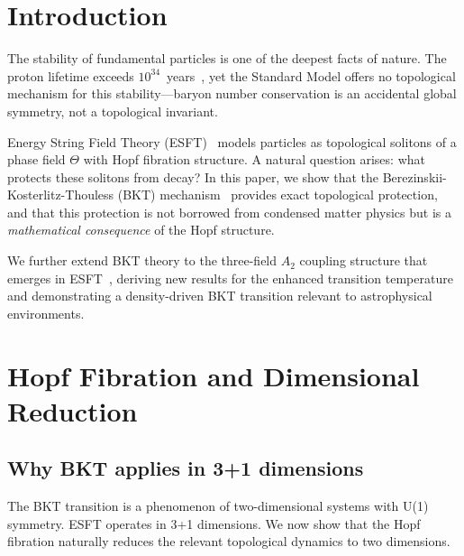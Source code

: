 ﻿\documentclass[twocolumn,showpacs,preprintnumbers,amsmath,amssymb,prd]{revtex4-2}
\begin{document}

\maketitle

\section{Introduction}

The stability of fundamental particles is one of the deepest facts of nature. The proton lifetime exceeds $10^{34}$~years~\cite{PDG2024}, yet the Standard Model offers no topological mechanism for this stability---baryon number conservation is an accidental global symmetry, not a topological invariant.

Energy String Field Theory (ESFT)~\cite{Paper1,Paper2,Paper3} models particles as topological solitons of a phase field $\Theta$ with Hopf fibration structure. A natural question arises: what protects these solitons from decay? In this paper, we show that the Berezinskii-Kosterlitz-Thouless (BKT) mechanism~\cite{Kosterlitz1973,Berezinskii1971} provides exact topological protection, and that this protection is not borrowed from condensed matter physics but is a \emph{mathematical consequence} of the Hopf structure.

We further extend BKT theory to the three-field $A_2$ coupling structure that emerges in ESFT~\cite{Paper2}, deriving new results for the enhanced transition temperature and demonstrating a density-driven BKT transition relevant to astrophysical environments.

\section{Hopf Fibration and Dimensional Reduction}
\label{sec:hopf}

\subsection{Why BKT applies in 3+1 dimensions}

The BKT transition is a phenomenon of two-dimensional systems with U(1) symmetry. ESFT operates in 3+1 dimensions. We now show that the Hopf fibration naturally reduces the relevant topological dynamics to two dimensions.
\end{document}
